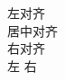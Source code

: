 \documentclass{ctexart}
\begin{document}
\parindent=0mm %
左对齐\hfill \mbox{} \\
\mbox{} \hfill 居中对齐\hfill \mbox{} \\
\mbox{} \hfill 右对齐\\
左 \hfill 右
\end{document}
